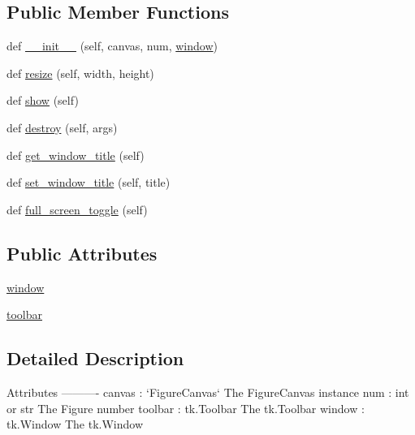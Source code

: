 \subsection*{Public Member Functions}
\begin{DoxyCompactItemize}
\item 
def \hyperlink{classmatplotlib_1_1backends_1_1__backend__tk_1_1FigureManagerTk_a6924424ee67c0761945440eb6aca7a45}{\+\_\+\+\_\+init\+\_\+\+\_\+} (self, canvas, num, \hyperlink{classmatplotlib_1_1backends_1_1__backend__tk_1_1FigureManagerTk_aeef626f65702f7c7708ffce5e87b281a}{window})
\item 
def \hyperlink{classmatplotlib_1_1backends_1_1__backend__tk_1_1FigureManagerTk_a5eebb62d70b471e4755d90f82830367b}{resize} (self, width, height)
\item 
def \hyperlink{classmatplotlib_1_1backends_1_1__backend__tk_1_1FigureManagerTk_a9b1e4cf41ff23c04ae5cfab42b3bef2b}{show} (self)
\item 
def \hyperlink{classmatplotlib_1_1backends_1_1__backend__tk_1_1FigureManagerTk_af5cbbb987164bf64fd102faba96abc7f}{destroy} (self, args)
\item 
def \hyperlink{classmatplotlib_1_1backends_1_1__backend__tk_1_1FigureManagerTk_ae4ff15846f7956f4f7ae2bef1a765cd7}{get\+\_\+window\+\_\+title} (self)
\item 
def \hyperlink{classmatplotlib_1_1backends_1_1__backend__tk_1_1FigureManagerTk_aa1cb472b7b990402e2c5f0c89a909dec}{set\+\_\+window\+\_\+title} (self, title)
\item 
def \hyperlink{classmatplotlib_1_1backends_1_1__backend__tk_1_1FigureManagerTk_abf04e5d940ba68daabbc5a0564f64045}{full\+\_\+screen\+\_\+toggle} (self)
\end{DoxyCompactItemize}
\subsection*{Public Attributes}
\begin{DoxyCompactItemize}
\item 
\hyperlink{classmatplotlib_1_1backends_1_1__backend__tk_1_1FigureManagerTk_aeef626f65702f7c7708ffce5e87b281a}{window}
\item 
\hyperlink{classmatplotlib_1_1backends_1_1__backend__tk_1_1FigureManagerTk_af86c5ac3ad892996901989ff5680be44}{toolbar}
\end{DoxyCompactItemize}


\subsection{Detailed Description}
\begin{DoxyVerb}Attributes
----------
canvas : `FigureCanvas`
    The FigureCanvas instance
num : int or str
    The Figure number
toolbar : tk.Toolbar
    The tk.Toolbar
window : tk.Window
    The tk.Window
\end{DoxyVerb}
 

